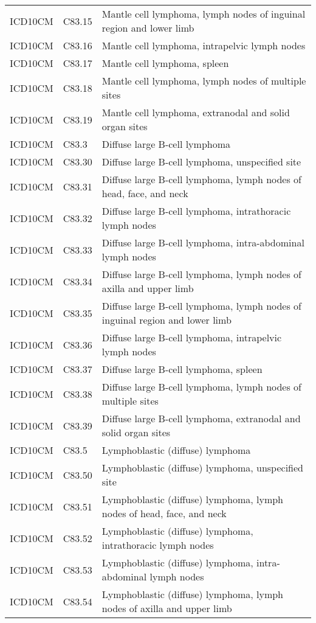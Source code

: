 \begin{longtable}{p{}p{}p{}}
  ICD10CM & C83.15 & Mantle cell lymphoma, lymph nodes of inguinal region and lower limb \\ 
  ICD10CM & C83.16 & Mantle cell lymphoma, intrapelvic lymph nodes \\ 
  ICD10CM & C83.17 & Mantle cell lymphoma, spleen \\ 
  ICD10CM & C83.18 & Mantle cell lymphoma, lymph nodes of multiple sites \\ 
  ICD10CM & C83.19 & Mantle cell lymphoma, extranodal and solid organ sites \\ 
  ICD10CM & C83.3 & Diffuse large B-cell lymphoma \\ 
  ICD10CM & C83.30 & Diffuse large B-cell lymphoma, unspecified site \\ 
  ICD10CM & C83.31 & Diffuse large B-cell lymphoma, lymph nodes of head, face, and neck \\ 
  ICD10CM & C83.32 & Diffuse large B-cell lymphoma, intrathoracic lymph nodes \\ 
  ICD10CM & C83.33 & Diffuse large B-cell lymphoma, intra-abdominal lymph nodes \\ 
  ICD10CM & C83.34 & Diffuse large B-cell lymphoma, lymph nodes of axilla and upper limb \\ 
  ICD10CM & C83.35 & Diffuse large B-cell lymphoma, lymph nodes of inguinal region and lower limb \\ 
  ICD10CM & C83.36 & Diffuse large B-cell lymphoma, intrapelvic lymph nodes \\ 
  ICD10CM & C83.37 & Diffuse large B-cell lymphoma, spleen \\ 
  ICD10CM & C83.38 & Diffuse large B-cell lymphoma, lymph nodes of multiple sites \\ 
  ICD10CM & C83.39 & Diffuse large B-cell lymphoma, extranodal and solid organ sites \\ 
  ICD10CM & C83.5 & Lymphoblastic (diffuse) lymphoma \\ 
  ICD10CM & C83.50 & Lymphoblastic (diffuse) lymphoma, unspecified site \\ 
  ICD10CM & C83.51 & Lymphoblastic (diffuse) lymphoma, lymph nodes of head, face, and neck \\ 
  ICD10CM & C83.52 & Lymphoblastic (diffuse) lymphoma, intrathoracic lymph nodes \\ 
  ICD10CM & C83.53 & Lymphoblastic (diffuse) lymphoma, intra-abdominal lymph nodes \\ 
  ICD10CM & C83.54 & Lymphoblastic (diffuse) lymphoma, lymph nodes of axilla and upper limb \\ 

\end{longtable}

